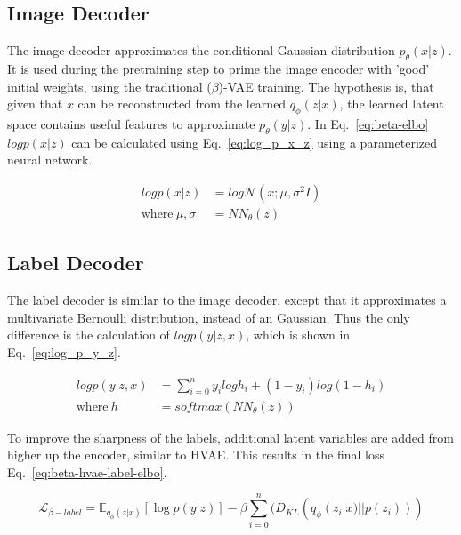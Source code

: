 \subsection{Image Decoder}
The image decoder approximates the conditional Gaussian distribution $p_\theta(x|z)$. It is used during the pretraining step to prime the image encoder with 'good' initial weights, using the traditional ($\beta$)-VAE training. The hypothesis is, that given that $x$ can be reconstructed from the learned $q_\phi(z|x)$, the learned latent space contains useful features to approximate $p_\theta(y|z)$. In Eq.~\ref{eq:beta-elbo} $log p(x|z)$ can be calculated using Eq.~\ref{eq:log_p_x_z} using a parameterized neural network.

\begin{equation}
    \begin{split}
        log p(x|z)              & = log \mathcal{N}(x; \mu, \sigma^2I) \label{eq:log_p_x_z} \\
        \text{where}~\mu,\sigma & =NN_\theta(z)
    \end{split}
\end{equation}

\subsection{Label Decoder}
The label decoder is similar to the image decoder, except that it approximates a multivariate Bernoulli distribution, instead of an Gaussian. Thus the only difference is the calculation of $log p(y|z,x)$, which is shown in Eq.~\ref{eq:log_p_y_z}.

\begin{subequations}
    \begin{align}
        log p(y|z, x)  & = \sum_{i=0}^n y_i log h_i + (1 - y_i)log(1-h_i) \label{eq:log_p_y_z} \\
        \text{where}~h & = softmax(NN_\theta(z))
    \end{align}
\end{subequations}

To improve the sharpness of the labels, additional latent variables are added from higher up the encoder, similar to HVAE. This results in the final loss Eq.~\ref{eq:beta-hvae-label-elbo}.

\begin{equation}
    \label{eq:beta-hvae-label-elbo}
    \mathcal{L}_{\beta-label} = \mathbb{E}_{q_{\phi}(z|x)}[\log p(y|z)] - \beta \sum_{i=0}^n(D_{KL}(q_{\phi}(z_i|x) || p(z_i)))
\end{equation}


